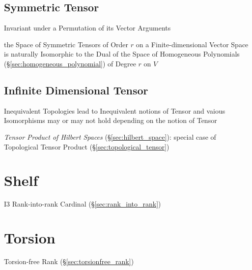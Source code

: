 \begin{itemize}
\subsection{Symmetric Tensor}\label{sec:symmetric_tensor}

Invariant under a Permutation of its Vector Arguments

the Space of Symmetric Tensors of Order $r$ on a Finite-dimensional Vector
Space is naturally Isomorphic to the Dual of the Space of Homogeneous
Polynomials (\S\ref{sec:homogeneous_polynomial}) of Degree $r$ on $V$



\subsection{Infinite Dimensional Tensor}
\label{sec:infinite_dimensional_tensor}

Inequivalent Topologies lead to Inequivalent notions of Tensor and
vaious Isomorphisms may or may not hold depending on the notion of
Tensor

\emph{Tensor Product of Hilbert Spaces} (\S\ref{sec:hilbert_space}):
special case of Topological Tensor Product
(\S\ref{sec:topological_tensor})



\section{Shelf}\label{sec:shelf}

I3 Rank-into-rank Cardinal (\S\ref{sec:rank_into_rank})



\section{Torsion}\label{sec:torsion}

Torsion-free Rank (\S\ref{sec:torsionfree_rank})




\end{itemize}
